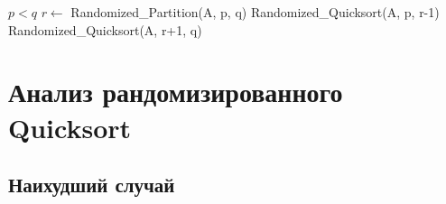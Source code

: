\documentclass[11pt]{article}
\begin{document}
\begin{codebox}
\li	\If $p < q$
\li		\Then $r \gets $ Randomized\_Partition(A, p, q)
\li			Randomized\_Quicksort(A, p, r-1)
\li			Randomized\_Quicksort(A, r+1, q)
	\End
\End
\end{codebox}

\section{Анализ рандомизированного Quicksort}

\subsection{Наихудший случай}
\end{document}
